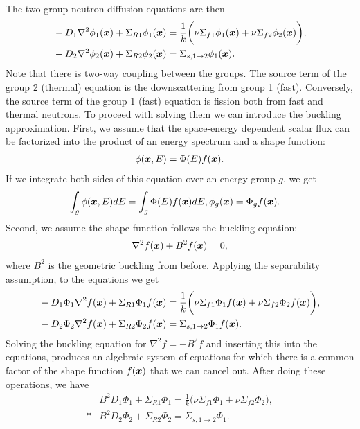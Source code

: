 The two-group neutron diffusion equations are then
\begin{align}
  &-D_1 \nabla^2 \phi_1(\bm{x}) + \Sigma_{R1} \phi_1(\bm{x}) = \frac{1}{k} \bigg( \nu\Sigma_{f1} \phi_1(\bm{x}) + \nu\Sigma_{f2} \phi_2(\bm{x}) \bigg) , \\*
  &-D_2 \nabla^2 \phi_2(\bm{x}) + \Sigma_{R2} \phi_2(\bm{x}) = \Sigma_{s,1\rightarrow 2} \phi_1(\bm{x}) .
\end{align}
Note that there is two-way coupling between the groups. The source term of the group 2 (thermal) equation is the downscattering from group 1 (fast). Conversely, the source term of the group 1 (fast) equation is fission both from fast and thermal neutrons. To proceed with solving them we can introduce the buckling approximation. First, we assume that the space-energy dependent scalar flux can be factorized into the product of an energy spectrum and a shape function:
\begin{align}
  \phi(\bm{x},E) = \Phi(E) f(\bm{x}).
\end{align}
If we integrate both sides of this equation over an energy group $g$, we get
\begin{align}
  \int_g \phi(\bm{x},E) dE &= \int_g  \Phi(E) f(\bm{x}) dE, \nonumber
  \phi_g(\bm{x}) = \Phi_g f(\bm{x}) .
\end{align}
Second, we assume the shape function follows the buckling equation:
\begin{align}
  \nabla^2 f(\bm{x}) + B^2 f(\bm{x}) = 0,
\end{align}
where $B^2$ is the geometric buckling from before. Applying the separability assumption, to the equations we get
\begin{align}
  &-D_1 \Phi_1 \nabla^2  f(\bm{x}) + \Sigma_{R1} \Phi_1 f(\bm{x}) = \frac{1}{k} \bigg( \nu\Sigma_{f1} \Phi_1 f(\bm{x}) + \nu\Sigma_{f2} \Phi_2 f(\bm{x}) \bigg) , \\*
  &-D_2 \Phi_2 \nabla^2  f(\bm{x}) + \Sigma_{R2} \Phi_2 f(\bm{x}) = \Sigma_{s,1\rightarrow 2} \Phi_1 f(\bm{x}) .
\end{align}
Solving the buckling equation for $\nabla^2 f = -B^2 f$ and inserting this into the equations, produces an algebraic system of equations for which there is a common factor of the shape function $f(\bm{x})$ that we can cancel out. After doing these operations, we have
\begin{align}
  &B^2 D_1 \Phi_1  + \Sigma_{R1} \Phi_1 = \frac{1}{k} \bigg( \nu\Sigma_{f1} \Phi_1  + \nu\Sigma_{f2} \Phi_2 \bigg) , \\*
  &B^2 D_2 \Phi_2  + \Sigma_{R2} \Phi_2  = \Sigma_{s,1\rightarrow 2} \Phi_1  .
\end{align}

